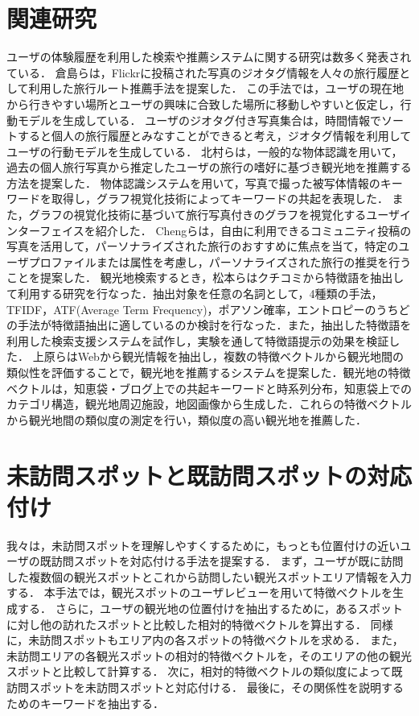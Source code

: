 \documentclass[submit]{ipsj}
\begin{document}
\section{関連研究}
ユーザの体験履歴を利用した検索や推薦システムに関する研究は数多く発表されている．
倉島ら\cite{Codd03}は，Flickrに投稿された写真のジオタグ情報を人々の旅行履歴として利用した旅行ルート推薦手法を提案した．
この手法では，ユーザの現在地から行きやすい場所とユーザの興味に合致した場所に移動しやすいと仮定し，行動モデルを生成している．
ユーザのジオタグ付き写真集合は，時間情報でソートすると個人の旅行履歴とみなすことができると考え，ジオタグ情報を利用してユーザの行動モデルを生成している．
北村らは\cite{Codd04}，一般的な物体認識を用いて，過去の個人旅行写真から推定したユーザの旅行の嗜好に基づき観光地を推薦する方法を提案した．
物体認識システムを用いて，写真で撮った被写体情報のキーワードを取得し，グラフ視覚化技術によってキーワードの共起を表現した．
また，グラフの視覚化技術に基づいて旅行写真付きのグラフを視覚化するユーザインターフェイスを紹介した．
Chengらは\cite{Codd05}，自由に利用できるコミュニティ投稿の写真を活用して，パーソナライズされた旅行のおすすめに焦点を当て，特定のユーザプロファイルまたは属性を考慮し，パーソナライズされた旅行の推奨を行うことを提案した．
観光地検索するとき，松本ら\cite{Codd08}はクチコミから特徴語を抽出して利用する研究を行なった．抽出対象を任意の名詞として，4種類の手法，TFIDF，ATF(Average Term Frequency)，ポアソン確率，エントロピーのうちどの手法が特徴語抽出に適しているのか検討を行なった．また，抽出した特徴語を利用した検索支援システムを試作し，実験を通して特徴語提示の効果を検証した．
上原ら\cite{Codd09}はWebから観光情報を抽出し，複数の特徴ベクトルから観光地間の類似性を評価することで，観光地を推薦するシステムを提案した．観光地の特徴ベクトルは，知恵袋・ブログ上での共起キーワードと時系列分布，知恵袋上でのカテゴリ構造，観光地周辺施設，地図画像から生成した．これらの特徴ベクトルから観光地間の類似度の測定を行い，類似度の高い観光地を推薦した．

\section{未訪問スポットと既訪問スポットの対応付け}
\label{sec:未訪問スポットと既訪問スポットの対応付け}

我々は，未訪問スポットを理解しやすくするために，もっとも位置付けの近いユーザの既訪問スポットを対応付ける手法を提案する．
まず，ユーザが既に訪問した複数個の観光スポットとこれから訪問したい観光スポットエリア情報を入力する．
本手法では，観光スポットのユーザレビューを用いて特徴ベクトルを生成する．
さらに，ユーザの観光地の位置付けを抽出するために，あるスポットに対し他の訪れたスポットと比較した相対的特徴ベクトルを算出する．
同様に，未訪問スポットもエリア内の各スポットの特徴ベクトルを求める．
また，未訪問エリアの各観光スポットの相対的特徴ベクトルを，そのエリアの他の観光スポットと比較して計算する．
次に，相対的特徴ベクトルの類似度によって既訪問スポットを未訪問スポットと対応付ける．
最後に，その関係性を説明するためのキーワードを抽出する．
\end{document}

